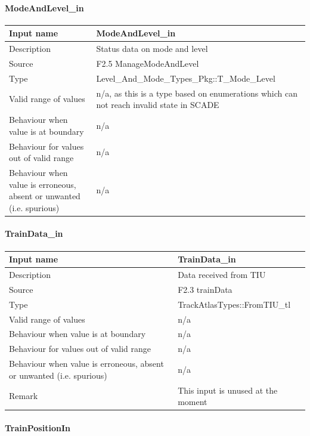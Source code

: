 \paragraph{ModeAndLevel\_in}

\begin{longtable}{p{}p{}}
\toprule
Input name				& ModeAndLevel\_in \\
\midrule
Description				& Status data on mode and level\\
\midrule
Source					& F2.5 ManageModeAndLevel \\ 
\midrule
Type					& Level\_And\_Mode\_Types\_Pkg::T\_Mode\_Level \\
\midrule
Valid range of values	& n/a, as this is a type based on enumerations which can not reach invalid state in SCADE \\
\midrule
Behaviour when value is at boundary	& n/a\\
\midrule
Behaviour for values out of valid range	& n/a\\
\midrule
Behaviour when value is erroneous, absent or unwanted (i.e. spurious) & n/a\\
\bottomrule
\end{longtable}

\paragraph{TrainData\_in}

\begin{longtable}{p{}p{}}
\toprule
Input name				& TrainData\_in\\
\midrule
Description				& Data received from TIU\\
\midrule
Source					& F2.3 trainData \\ 
\midrule
Type					& TrackAtlasTypes::FromTIU\_tl \\
\midrule
Valid range of values	& n/a\\
\midrule
Behaviour when value is at boundary	& n/a\\
\midrule
Behaviour for values out of valid range	& n/a\\
\midrule
Behaviour when value is erroneous, absent or unwanted (i.e. spurious) & n/a\\
\midrule
Remark & This input is unused at the moment\\

\bottomrule
\end{longtable}

\paragraph{TrainPositionIn}

